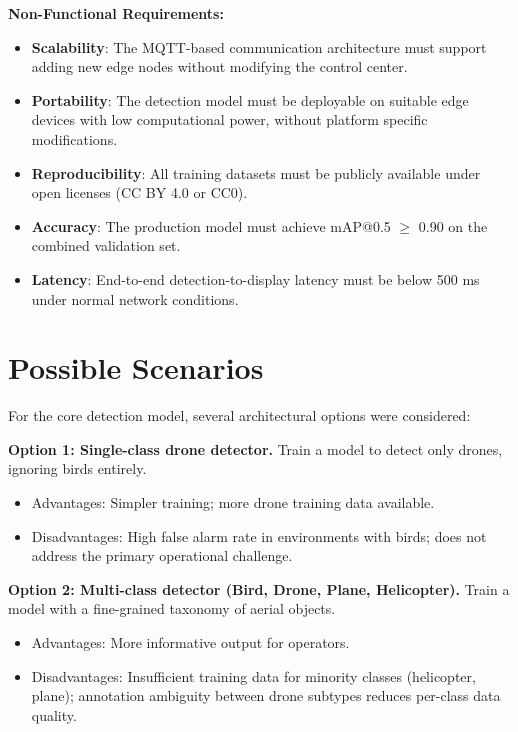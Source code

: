 \documentclass[12pt,a4paper]{report}
\begin{document}
\textbf{Non-Functional Requirements:}
\begin{itemize}
  \item \textbf{Scalability}: The MQTT-based communication architecture must
        support adding new edge nodes without modifying the control center.
  \item \textbf{Portability}: The detection model must be deployable on
        suitable edge devices with low computational power,
        without platform specific modifications.
  \item \textbf{Reproducibility}: All training datasets must be publicly
        available under open licenses (CC BY 4.0 or CC0).
  \item \textbf{Accuracy}: The production model must achieve mAP@0.5 $\geq$
        0.90 on the combined validation set.
  \item \textbf{Latency}: End-to-end detection-to-display latency must be
        below 500 ms under normal network conditions.
\end{itemize}

\section{Possible Scenarios}

For the core detection model, several architectural options were considered:

\textbf{Option 1: Single-class drone detector.}
Train a model to detect only drones, ignoring birds entirely.
\begin{itemize}
  \item Advantages: Simpler training; more drone training data available.
  \item Disadvantages: High false alarm rate in environments with birds;
        does not address the primary operational challenge.
\end{itemize}

\textbf{Option 2: Multi-class detector (Bird, Drone, Plane, Helicopter).}
Train a model with a fine-grained taxonomy of aerial objects.
\begin{itemize}
  \item Advantages: More informative output for operators.
  \item Disadvantages: Insufficient training data for minority classes
        (helicopter, plane); annotation ambiguity between drone subtypes
        reduces per-class data quality.
\end{itemize}
\end{document}
